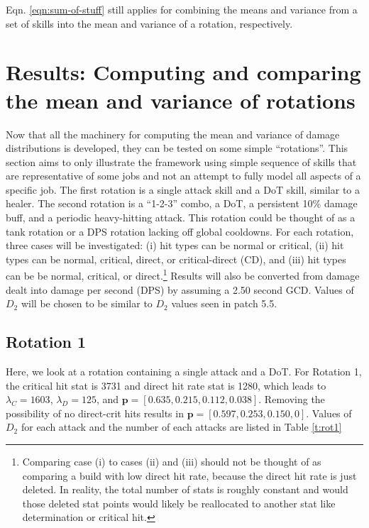 \documentclass{article}
\begin{document}
        Eqn. \ref{eqn:sum-of-stuff} still applies for combining the means and variance from a set of skills into the mean and variance of a rotation, respectively.

        \section{Results: Computing and comparing the mean and variance of rotations}

        Now that all the machinery for computing the mean and variance of damage distributions is developed, they can be tested on some simple ``rotations''. This section aims to only illustrate the framework using simple sequence of skills that are representative of some jobs and not an attempt to fully model all aspects of a specific job. The first rotation is a single attack skill and a DoT skill, similar to a healer. The second rotation is a ``1-2-3'' combo, a DoT, a persistent 10\% damage buff, and a periodic heavy-hitting attack. This rotation could be thought of as a tank rotation or a DPS rotation lacking off global cooldowns. For each rotation, three cases will be investigated: (i) hit types can be normal or critical, (ii) hit types can be normal, critical, direct, or critical-direct (CD), and (iii) hit types can be be normal, critical, or direct.\footnote{Comparing case (i) to cases (ii) and (iii) should not be thought of as comparing a build with low direct hit rate, because the direct hit rate is just deleted. In reality, the total number of stats is roughly constant and would those deleted stat points would likely be reallocated to another stat like determination or critical hit.} Results will also be converted from damage dealt into damage per second (DPS) by assuming a 2.50 second GCD. Values of $D_2$ will be chosen to be similar to $D_2$ values seen in patch 5.5. 
        
        \subsection{Rotation 1}
            Here, we look at a rotation containing a single attack and a DoT. For Rotation 1, the critical hit stat is 3731 and direct hit rate stat is 1280, which leads to $\lambda_C = 1603$, $\lambda_D = 125$, and $\textbf{p} = [0.635, 0.215, 0.112, 0.038]$. Removing the possibility of no direct-crit hits results in $\textbf{p} = [0.597, 0.253, 0.150, 0]$. Values of $D_2$ for each attack and the number of each attacks are listed in Table \ref{t:rot1}
\end{document}
